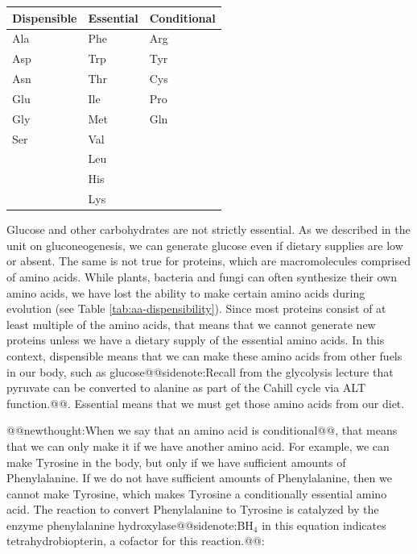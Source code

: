 \documentclass{tufte-handout}
\makeatletter
\def\newthought#1{@@newthought:#1@@}
\def\sidenote#1{@@sidenote:#1@@}
\makeatother
\begin{document}
\begin{margintable}
\centering
\caption{Amino Acid Essentiality.}
\label{tab:aa-dispensibility}
\begin{tabular}{lll}
\hline
\textbf {Dispensible} & \textbf{Essential} & \textbf{Conditional}\\
\hline
Ala & Phe & Arg\\
Asp & Trp & Tyr\\
Asn & Thr & Cys\\
Glu & Ile & Pro\\
Gly & Met & Gln\\
Ser & Val\\
 & Leu\\
 & His\\
 & Lys\\
\hline
\end{tabular}
\end{margintable}

Glucose and other carbohydrates are not strictly essential.  As we described in the unit on gluconeogenesis, we can generate glucose even if dietary supplies are low or absent.  The same is not true for proteins, which are macromolecules comprised of amino acids.  While plants, bacteria and fungi can often synthesize their own amino acids, we have lost the ability to make certain amino acids during evolution (see Table \ref{tab:aa-dispensibility}).  Since most proteins consist of at least multiple of the amino acids, that means that we cannot generate new proteins unless we have a dietary supply of the essential amino acids.  In this context, dispensible means that we can make these amino acids from other fuels in our body, such as glucose\sidenote{Recall from the glycolysis lecture that pyruvate can be converted to alanine as part of the Cahill cycle via ALT\index{Enzymes!Alanine Aminotransferase (ALT)} function.}.  Essential means that we must get those amino acids from our diet.  

\newthought{When we say that an amino acid is conditional}, that means that we can only make it if we have another amino acid.   For example, we can make Tyrosine in the body, but only if we have sufficient amounts of Phenylalanine. If we do not have sufficient amounts of Phenylalanine, then we cannot make Tyrosine, which makes Tyrosine a conditionally essential amino acid. The reaction to convert Phenylalanine to Tyrosine is catalyzed by the enzyme phenylalanine hydroxylase\sidenote{BH$_4$ in this equation indicates tetrahydrobiopterin, a cofactor for this reaction.}:
\end{document}
